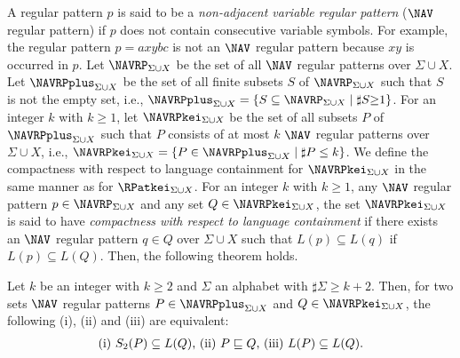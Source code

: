 

A regular pattern $p$ is said to be a {\it non-adjacent variable regular pattern} ($\NAV$ regular pattern)  
if $p$ does not contain consecutive variable symbols.
For example, the regular pattern $p=axybc$ is not an $\NAV$ regular pattern because $xy$ is occurred in $p$.
Let {\color{black}$\NAVRP_{\Sigma\cup X}$} be the set of all $\NAV$ regular patterns {\color{black} over $\Sigma\cup X$}.
Let {\color{black}$\NAVRPplus_{\Sigma\cup X}$} be the set of all finite subsets $S$ of {\color{black}$\NAVRP_{\Sigma\cup X}$} such that $S$ is not the empty set, i.e., {\color{black}$\NAVRPplus_{\Sigma\cup X}=\{S \subseteq \NAVRP_{\Sigma\cup X} \mid \sharp S {\color{black} \geq} 1\}$}.
{\color{black}For an integer $k$ with $k\geq 1$, let $\NAVRPkei_{\Sigma\cup X}$ be} the set of all subsets $P$ of {\color{black}$\NAVRPplus_{\Sigma\cup X}$} such that $P$ consists of at most $k$ $\NAV$ regular patterns {\color{black}over $\Sigma\cup X$}, i.e., {\color{black}$\NAVRPkei_{\Sigma\cup X}=\{P\in \NAVRPplus_{\Sigma\cup X} \mid \sharp P \leq k\}$.}
We define the compactness with respect to {\color{black} language} containment for {\color{black}$\NAVRPkei_{\Sigma\cup X}$ in the same manner as for} {\color{black}$\RPatkei_{\Sigma\cup X}$}.%
 For an integer $k$ with $k\geq 1$, any $\NAV$ regular pattern $p \in \NAVRP_{\Sigma\cup X}$ and any set $Q \in \NAVRPkei_{\Sigma\cup X}$,
  the set $\NAVRPkei_{\Sigma\cup X}$ {\color{black} is said} to have {\it compactness with respect to {\color{black}language} containment}
  if there exists an $\NAV$ regular pattern $q \in Q$ over $\Sigma\cup X$ such that $L(p) \subseteq L(q)$ if $L(p) \subseteq L(Q)$.
Then, the following {\color{black}theorem} holds.

\begin{thm}\label{KeyTheoforNAVRP}
{\color{black} Let $k$ be an integer with $k\ge 2$ and $\Sigma$ an alphabet with $\sharp \Sigma \ge k+2$.}
Then, {\color{black} for two sets $\NAV$ regular patterns $P\in \NAVRPplus_{\Sigma\cup X}$ and $Q \in \NAVRPkei_{\Sigma\cup X}$,} the following (i), (ii) and (iii) are equivalent:
\[
\begin{tabular}{ll}
(i) $S_{2}(P) \subseteq L(Q)$,
(ii) $P \sqsubseteq Q$,
(iii) $L(P) \subseteq L(Q)$.
\end{tabular}
\]
\end{thm}

